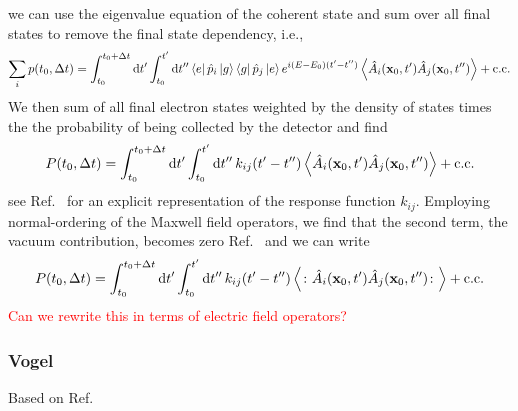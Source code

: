we can use the eigenvalue equation of the coherent state and sum over all final states to remove the final state dependency, i.e.,
\begin{equation}
	\sum_i
	p(t_0,\Delta t)
	=
	\int_{t_0}^{t_0+\Delta t}\dd{t^\prime}
	\int_{t_0}^{t^\prime}\dd{t^{\prime\prime}}
	\bra{e}\hat{p}_i\ket{g}
	\bra{g}\hat{p}_j\ket{e}
	e^{i(E-E_0)(t^\prime-t^{\prime\prime})}
	\expval{\hat{A}_i(\vb{x}_0,t^\prime)\hat{A}_j(\vb{x}_0,t^{\prime\prime})}
	+
	\text{c.c.}
\end{equation}
We then sum of all final electron states weighted by the density of states times the the probability of being collected by the detector and find
\begin{equation}
	P(t_0,\Delta t)
	=
	\int_{t_0}^{t_0+\Delta t}\dd{t^\prime}
	\int_{t_0}^{t^\prime}\dd{t^{\prime\prime}}
	k_{ij}(t^\prime-t^{\prime\prime})
	\expval{\hat{A}_i(\vb{x}_0,t^\prime)\hat{A}_j(\vb{x}_0,t^{\prime\prime})}
	+
	\text{c.c.}
\end{equation}
see Ref.~\cite[p.~694]{Mandel1995} for an explicit representation of the response function $k_{ij}$.
Employing normal-ordering of the Maxwell field operators, we find that the second term, the vacuum contribution, becomes zero Ref.~\cite[p.~694]{Mandel1995} and we can write
\begin{equation}
	P(t_0,\Delta t)
	=
	\int_{t_0}^{t_0+\Delta t}\dd{t^\prime}
	\int_{t_0}^{t^\prime}\dd{t^{\prime\prime}}
	k_{ij}(t^\prime-t^{\prime\prime})
	\expval{\colon\hat{A}_i(\vb{x}_0,t^\prime)\hat{A}_j(\vb{x}_0,t^{\prime\prime})\colon}
	+
	\text{c.c.}
\end{equation}
\textcolor{red}{Can we rewrite this in terms of electric field operators?}

\subsubsection{Vogel}

Based on Ref.~\cite[p.~48]{Vogel2006}

